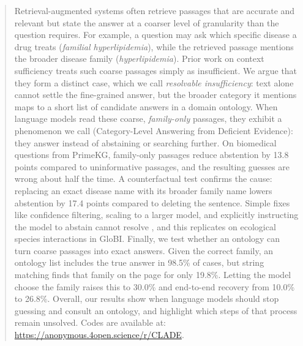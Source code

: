 \begin{abstract}
Retrieval-augmented systems often retrieve passages that are accurate and relevant but state the answer at a coarser level of granularity than the question requires. For example, a question may ask which specific disease a drug treats (\emph{familial hyperlipidemia}), while the retrieved passage mentions the broader disease family (\emph{hyperlipidemia}). Prior work on context sufficiency treats such coarse passages simply as insufficient. We argue that they form a distinct case, which we call \emph{resolvable insufficiency}: text alone cannot settle the fine-grained answer, but the broader category it mentions maps to a short list of candidate answers in a domain ontology. When language models read these coarse, \emph{family-only} passages, they exhibit a phenomenon we call \clade{} (Category-Level Answering from Deficient Evidence): they answer instead of abstaining or searching further. On biomedical questions from PrimeKG, family-only passages reduce abstention by 13.8 points compared to uninformative passages, and the resulting guesses are wrong about half the time. A counterfactual test confirms the cause: replacing an exact disease name with its broader family name lowers abstention by 17.4 points compared to deleting the sentence. Simple fixes like confidence filtering, scaling to a larger model, and explicitly instructing the model to abstain cannot resolve \clade{}, and this replicates on ecological species interactions in GloBI. Finally, we test whether an ontology can turn coarse passages into exact answers. Given the correct family, an ontology list includes the true answer in 98.5\% of cases, but string matching finds that family on the page for only 19.8\%. Letting the model choose the family raises this to 30.0\% and end-to-end recovery from 10.0\% to 26.8\%. Overall, our results show when language models should stop guessing and consult an ontology, and highlight which steps of that process remain unsolved. Codes are available at: \url{https://anonymous.4open.science/r/CLADE}.
\end{abstract}